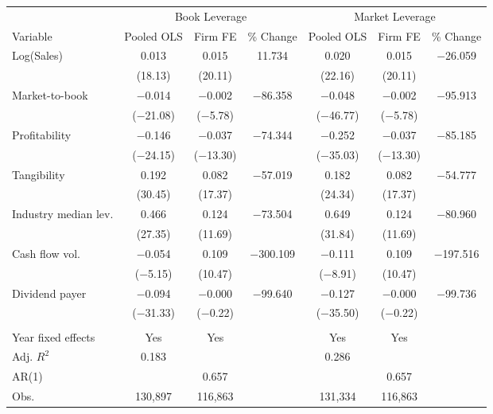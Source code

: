 \begin{tabular}{l*{6}{c}}
\toprule
 & \multicolumn{3}{c}{Book Leverage} & \multicolumn{3}{c}{Market Leverage} \\ \cmidrule(lr){2-4} \cmidrule(lr){5-7}
Variable & Pooled OLS & Firm FE & \% Change & Pooled OLS & Firm FE & \% Change \\ \midrule
Log(Sales)  &       0.013&       0.015&      11.734&       0.020&       0.015&   $-$26.059\\
            &     (18.13)&     (20.11)&            &     (22.16)&     (20.11)&            \\
\addlinespace
Market-to-book&    $-$0.014&    $-$0.002&   $-$86.358&    $-$0.048&    $-$0.002&   $-$95.913\\
            &  ($-$21.08)&   ($-$5.78)&            &  ($-$46.77)&   ($-$5.78)&            \\
\addlinespace
Profitability&    $-$0.146&    $-$0.037&   $-$74.344&    $-$0.252&    $-$0.037&   $-$85.185\\
            &  ($-$24.15)&  ($-$13.30)&            &  ($-$35.03)&  ($-$13.30)&            \\
\addlinespace
Tangibility &       0.192&       0.082&   $-$57.019&       0.182&       0.082&   $-$54.777\\
            &     (30.45)&     (17.37)&            &     (24.34)&     (17.37)&            \\
\addlinespace
Industry median lev.&       0.466&       0.124&   $-$73.504&       0.649&       0.124&   $-$80.960\\
            &     (27.35)&     (11.69)&            &     (31.84)&     (11.69)&            \\
\addlinespace
Cash flow vol.&    $-$0.054&       0.109&  $-$300.109&    $-$0.111&       0.109&  $-$197.516\\
            &   ($-$5.15)&     (10.47)&            &   ($-$8.91)&     (10.47)&            \\
\addlinespace
Dividend payer&    $-$0.094&    $-$0.000&   $-$99.640&    $-$0.127&    $-$0.000&   $-$99.736\\
            &  ($-$31.33)&   ($-$0.22)&            &  ($-$35.50)&   ($-$0.22)&            \\
\\
Year fixed effects&         Yes&         Yes&            &         Yes&         Yes&            \\
Adj. $ R^2$ &       0.183&            &            &       0.286&            &            \\
AR(1)       &            &       0.657&            &            &       0.657&            \\
Obs.        &     130,897&     116,863&            &     131,334&     116,863&            \\
\bottomrule
\end{tabular}
